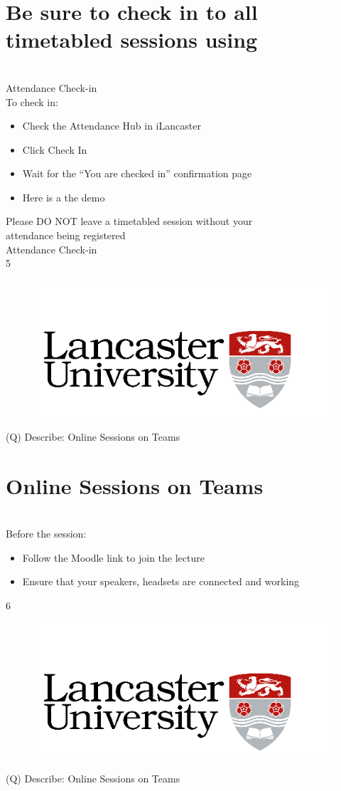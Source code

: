 \documentclass[12pt]{article}
\begin{document}
\section{Be sure to check in to all timetabled sessions using }
\\
Attendance Check-in\\
To check in:\\
\begin{itemize}
  \item Check the Attendance Hub in iLancaster
  \item Click Check In
  \item Wait for the “You are checked in” confirmation page
  \item Here is a the demo
\end{itemize}
Please DO NOT leave a timetabled session without your\\
attendance being registered\\
Attendance Check-in\\
5\\
\begin{figure}[H]
\includegraphics[width=0.5\linewidth]{page1-image-1.png}
\end{figure}
\clearpage
(Q)
Describe: Online Sessions on Teams
\clearpage
\section{Online Sessions on Teams}
\\
Before the session:\\
\begin{itemize}
  \item Follow the Moodle link to join the lecture
  \item Ensure that your speakers, headsets are connected and working
\end{itemize}
6\\
\begin{figure}[H]
\includegraphics[width=0.5\linewidth]{page1-image-1.png}
\end{figure}
\clearpage
(Q)
Describe: Online Sessions on Teams
\clearpage
\end{document}
